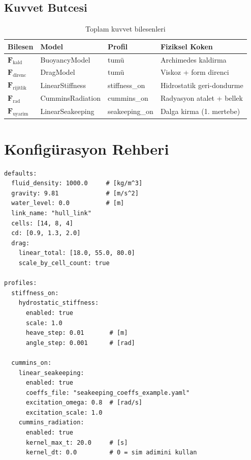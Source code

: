 \documentclass[12pt,a4paper]{article}
\newcommand{\Fvec}{\mathbf{F}}
\begin{document}
\subsection{Kuvvet Butcesi}

\begin{table}[H]
  \centering
  \caption{Toplam kuvvet bilesenleri}
  \begin{tabularx}{\linewidth}{lllX}
    \toprule
    \textbf{Bilesen} & \textbf{Model} & \textbf{Profil} & \textbf{Fiziksel Koken} \\
    \midrule
    $\Fvec_{\text{kald}}$ & BuoyancyModel & tumü & Archimedes kaldirma \\
    $\Fvec_{\text{direnc}}$ & DragModel & tumü & Viskoz + form direnci \\
    $\Fvec_{\text{rijitlik}}$ & LinearStiffness & stiffness\_on & Hidrostatik geri-dondurme \\
    $\Fvec_{\text{rad}}$ & CumminsRadiation & cummins\_on & Radyasyon atalet + bellek \\
    $\Fvec_{\text{uyarim}}$ & LinearSeakeeping & seakeeping\_on & Dalga kirma (1. mertebe) \\
    \bottomrule
  \end{tabularx}
\end{table}

\section{Konfigürasyon Rehberi}

\begin{lstlisting}
defaults:
  fluid_density: 1000.0     # [kg/m^3]
  gravity: 9.81             # [m/s^2]
  water_level: 0.0          # [m]
  link_name: "hull_link"
  cells: [14, 8, 4]
  cd: [0.9, 1.3, 2.0]
  drag:
    linear_total: [18.0, 55.0, 80.0]
    scale_by_cell_count: true

profiles:
  stiffness_on:
    hydrostatic_stiffness:
      enabled: true
      scale: 1.0
      heave_step: 0.01       # [m]
      angle_step: 0.001      # [rad]

  cummins_on:
    linear_seakeeping:
      enabled: true
      coeffs_file: "seakeeping_coeffs_example.yaml"
      excitation_omega: 0.8  # [rad/s]
      excitation_scale: 1.0
    cummins_radiation:
      enabled: true
      kernel_max_t: 20.0     # [s]
      kernel_dt: 0.0         # 0 = sim adimini kullan
\end{lstlisting}
\end{document}
